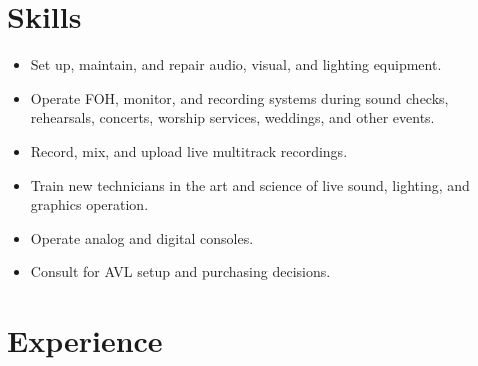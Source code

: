 \documentclass[12pt,sans,colorlinks,linkcolor=true]{moderncv}        %
\begin{document}
\hypersetup{urlcolor=links}
\makecvtitle
\section{Skills}

\begin{itemize}
\item Set up, maintain, and repair audio, visual, and lighting equipment.
\item Operate FOH, monitor, and recording systems during sound checks, rehearsals, concerts, worship services, weddings, and other events.
\item Record, mix, and upload live multitrack recordings.
\item Train new technicians in the art and science of live sound, lighting, and graphics operation.
\item Operate analog and digital consoles.
\item Consult for AVL setup and purchasing decisions.
\end{itemize}
\section{Experience}

\end{document}
